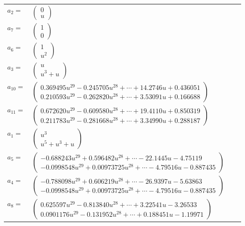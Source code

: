 \documentclass[1p]{elsarticle_modified}
\theoremstyle{definition}
\begin{document}
\begin{tabular}{m{7pt} m{180pt} m{7pt} m{180pt} }
\flushright $a_{2}=$&$\begin{pmatrix}0\\u\end{pmatrix}$ \\
\flushright $a_{7}=$&$\begin{pmatrix}1\\0\end{pmatrix}$ \\
\flushright $a_{6}=$&$\begin{pmatrix}1\\u^2\end{pmatrix}$ \\
\flushright $a_{3}=$&$\begin{pmatrix}u\\u^3+u\end{pmatrix}$ \\
\flushright $a_{10}=$&$\begin{pmatrix}0.369495 u^{29}-0.245705 u^{28}+\cdots+14.2746 u+0.436051\\0.210593 u^{29}-0.262820 u^{28}+\cdots+3.53091 u+0.166688\end{pmatrix}$ \\
\flushright $a_{11}=$&$\begin{pmatrix}0.672620 u^{29}-0.609580 u^{28}+\cdots+19.4110 u+0.850319\\0.211783 u^{29}-0.281668 u^{28}+\cdots+3.34990 u+0.288187\end{pmatrix}$ \\
\flushright $a_{1}=$&$\begin{pmatrix}u^3\\u^5+u^3+u\end{pmatrix}$ \\
\flushright $a_{5}=$&$\begin{pmatrix}-0.688243 u^{29}+0.596482 u^{28}+\cdots-22.1445 u-4.75119\\-0.0998548 u^{29}+0.00973725 u^{28}+\cdots-4.79516 u-0.887435\end{pmatrix}$ \\
\flushright $a_{4}=$&$\begin{pmatrix}-0.788098 u^{29}+0.606219 u^{28}+\cdots-26.9397 u-5.63863\\-0.0998548 u^{29}+0.00973725 u^{28}+\cdots-4.79516 u-0.887435\end{pmatrix}$ \\
\flushright $a_{8}=$&$\begin{pmatrix}0.625597 u^{29}-0.813840 u^{28}+\cdots+3.22541 u-3.26533\\0.0901176 u^{29}-0.131952 u^{28}+\cdots+0.188451 u-1.19971\end{pmatrix}$ \\

\end{tabular}
\end{document}
